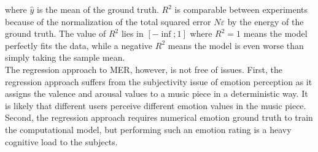 where $\widehat{y}$ is the mean of the ground truth. $R^2$ is comparable between experiments because of the normalization of the total squared error $N\varepsilon$ by the energy of the ground truth. The value of $R^2$  lies in $[-\inf;1]$ where $R^2=1$ means the model perfectly fits the data, while a negative $R^2$ means the model is even worse than simply taking the sample mean.
\\ \indent
The regression approach to MER, however, is not free of issues. First, the regression approach suffers from the subjectivity issue of emotion perception as it assigns the valence and arousal values to a music piece in a deterministic way. It is likely that different users perceive different emotion values in the music piece. Second, the regression approach requires numerical emotion ground truth to train the computational model, but performing such an emotion rating is a heavy cognitive load to the subjects.




